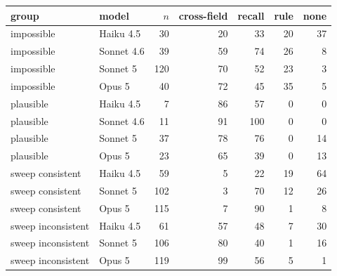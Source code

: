 \begin{tabular}{llrrrrr}
\toprule
group & model & $n$ & cross-field & recall & rule & none \\
\midrule
impossible & Haiku 4.5 & 30 & 20 & 33 & 20 & 37 \\
impossible & Sonnet 4.6 & 39 & 59 & 74 & 26 & 8 \\
impossible & Sonnet 5 & 120 & 70 & 52 & 23 & 3 \\
impossible & Opus 5 & 40 & 72 & 45 & 35 & 5 \\
plausible & Haiku 4.5 & 7 & 86 & 57 & 0 & 0 \\
plausible & Sonnet 4.6 & 11 & 91 & 100 & 0 & 0 \\
plausible & Sonnet 5 & 37 & 78 & 76 & 0 & 14 \\
plausible & Opus 5 & 23 & 65 & 39 & 0 & 13 \\
sweep consistent & Haiku 4.5 & 59 & 5 & 22 & 19 & 64 \\
sweep consistent & Sonnet 5 & 102 & 3 & 70 & 12 & 26 \\
sweep consistent & Opus 5 & 115 & 7 & 90 & 1 & 8 \\
sweep inconsistent & Haiku 4.5 & 61 & 57 & 48 & 7 & 30 \\
sweep inconsistent & Sonnet 5 & 106 & 80 & 40 & 1 & 16 \\
sweep inconsistent & Opus 5 & 119 & 99 & 56 & 5 & 1 \\
\bottomrule
\end{tabular}
